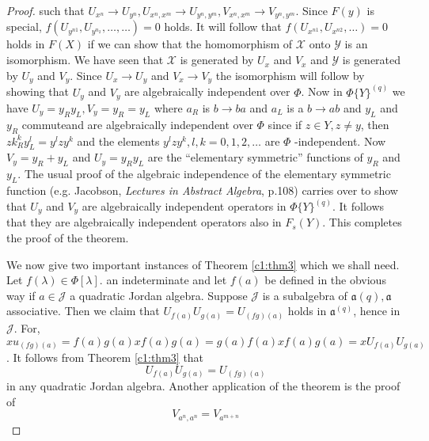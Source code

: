 \begin{proof}
  such that $U_{x^{n}}\to U_{y^{n}},U_{x^{n},x^{m}}\to
  U_{y^{n},y^{m}},V_{x^{n},x^{m}}\to V_{y^{n},y^{m}}$. Since $F(y)$
  is special, $f(U_{y^{n1}},U_{y^{n_{2}}},\ldots,\ldots)=0$ holds. It
  will follow that $f(U_{x^{n1}},U_{x^{n2}},\ldots)=0$ holds in $F(X)$
  if we can show that the homomorphism of $\mathscr{X}$ onto
  $\mathscr{Y}$ is an isomorphism. We have seen that $\mathscr{X}$ is
  generated by $U_x$ and $V_x$ and $\mathscr{Y}$ is generated by $U_y$
  and $V_y$. Since $U_x\to U_y$ and $V_x\to V_y$ the isomorphism will
  follow by showing that $U_y$ and $V_y$ are algebraically independent
  over $\Phi$. Now in $\Phi\{Y\}^{(q)}$ we have
  $U_y=y_Ry_L,V_y=y_R=y_L$ where $a_R$ is $b\to ba$ and $a_L$ is a
  $b\to ab$ and $y_L$ and $y_R$ commute\pageoriginale and are
  algebraically independent over $\Phi$ since if $z\in Y,z\neq y$, then
  $zk^{k}_Ry^{l}_L=y^{l}zy^{k}$ and the elements $y^{l} zy^{k},
  l,k=0,1,2,\ldots$ are $\Phi$ -independent. Now $V_y=y_R+y_L$ and
  $U_y=y_R y_L$ are the ``elementary symmetric'' functions of $y_R$
  and $y_L$. The usual proof of the algebraic independence of the
  elementary symmetric function (e.g. Jacobson, {\em Lectures in
    Abstract Algebra}, p.108) carries over to show that $U_y$ and
  $V_y$ are algebraically independent operators in
  $\Phi\{Y\}^{(q)}$. It follows that they are algebraically
  independent operators also in $F_s(Y)$. This completes the proof of
  the theorem. 

We now give two important instances of Theorem \ref{c1:thm3} which we shall
need. Let $f(\lambda)\in \Phi[\lambda]$. an indeterminate and let
$f(a)$ be defined in the obvious way if $a\in \mathscr{J}$ a quadratic
Jordan algebra. Suppose $\mathscr{J}$ is a subalgebra of
$\mathfrak{a}(q), \mathfrak{a}$ associative. Then we claim that
$U_{f(a)}U_{g(a)}=U_{(fg)(a)}$ holds in $\mathfrak{a}^{(q)}$, hence in
$\mathscr{J}$. For,
$xu_{(fg)(a)}=f(a)g(a)xf(a)g(a)=g(a)f(a)xf(a)g(a)=xU_{f(a)}U_{g(a)}$. It
follows from Theorem \ref{c1:thm3} that 
\begin{equation*}
U_{f(a)}U_{g(a)}=U_{(fg)(a)}\tag*{QJ 37}
\end{equation*}
in any quadratic Jordan algebra. Another application of the theorem is
the proof of 
\begin{equation*}
  V_{a^{n},a^{n}}=V_{a^{m+n}}\tag*{QJ 38}
\end{equation*}


\end{proof}

